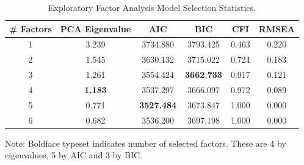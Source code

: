 \documentclass[man, 12pt]{apa7} %
\begin{document}
\begin{table}[htbp]
    \centering
    \caption{Exploratory Factor Analysis Model Selection Statistics.}
    \label{tab:EFA-10}
    \begin{threeparttable}
        \begin{tabular}{cccccc
        }
            \toprule
            {# Factors} & {PCA Eigenvalue} & {AIC} & {BIC} & {CFI} & {RMSEA}\\
            \midrule
            1 & 3.239 & 3734.880 & 3793.425 & 0.463 & 0.220\\
            2 & 1.545 & 3630.132 & 3715.022 & 0.724 & 0.183\\
            3 & 1.261 & 3554.424 & {\textbf{3662.733}} & 0.917 & 0.121\\
            4 & \textbf{1.183} & 3537.297 & 3666.097 & 0.972 & 0.089\\
            5 & 0.771 & {\textbf{3527.484}} & 3673.847 & 1.000 & 0.000\\
            6 & 0.682 & 3536.200 & 3697.198 & 1.000 & 0.000\\
            \bottomrule
        \end{tabular}
        \vspace{5pt}
        \begin{tablenotes}
            \small
            \item Note: Boldface typeset indicates number of selected factors.  These are 4 by eigenvalues, 5 by AIC and 3 by BIC.
        \end{tablenotes}
    \end{threeparttable}
\end{table}
\end{document}
